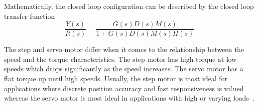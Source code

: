 Mathematically, the closed loop configuration can be described by the closed loop transfer function
\begin{equation}
    \frac{Y(s)}{R(s)} = \frac{G(s)D(s)M(s)}{1+G(s)D(s)M(s)H(s)}
\end{equation}

The step and servo motor differ when it comes to the relationship between the speed and the torque characteristics. The step motor has high torque at low speeds which drops significantly as the speed increases. The servo motor has a flat torque up until high speeds. Usually, the step motor is most ideal for applications where discrete position accuracy and fast responsiveness is valued whereas the servo motor is most ideal in applications with high or varying loads~\cite{servo_step}.